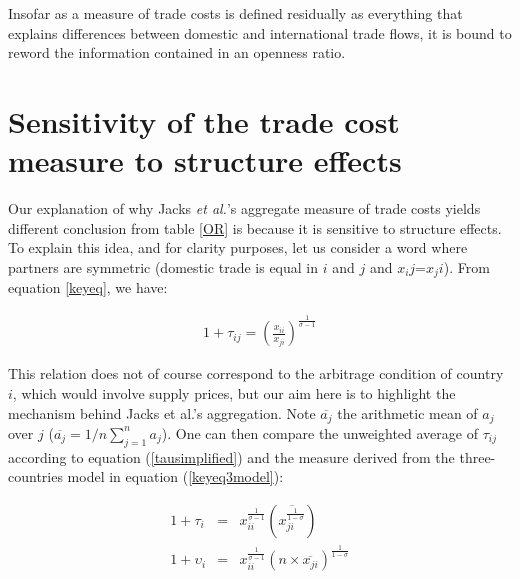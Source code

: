\documentclass{article}
\begin{document}
Insofar as a measure of trade costs is defined residually as everything that explains differences between domestic and international trade flows, it is bound to reword the information contained in an openness ratio.

\section{\label{3} Sensitivity of the trade cost measure to
structure effects}

Our explanation of why Jacks \textit{et al.}'s aggregate measure of
trade costs yields different conclusion 
from table \ref{OR} is because it is sensitive to structure
effects. To explain this idea, and for clarity purposes, let us consider
a word where partners are symmetric (domestic trade is equal in $i$ and $j$ and $x_ij$=$x_ji$). From equation \ref{keyeq}, we have:

\begin{eqnarray}
1+\tau_{ij}= \left(\frac{x_{ii}}{x_{ji}}\right)^{\frac{1}{\sigma-1}}\label{tausimplified}
\end{eqnarray}

This relation does not of course correspond to the arbitrage
condition of country $i$, which would involve supply prices,
but our aim here is to highlight the mechanism behind Jacks et
al.'s aggregation. Note $\overline{a_j}$ the arithmetic mean
of $a_j$ over $j$ ($\overline{a_j}=1/n \sum_{j=1}^{n}a_j$). One can
then compare the unweighted average of $\tau_{ij}$ according to equation 
(\ref{tausimplified}) and the measure derived from the
three-countries model in equation (\ref{keyeq3model}):

\begin{eqnarray}
1+\tau_i&=& x_{ii}^{\frac{1}{\sigma-1}} \left(\overline{{x_{ji}^{\frac{1}{1-\sigma}}}}\right) \label{tau}\\
1+\upsilon_i&=&x_{ii}^{\frac{1}{\sigma-1}} (n \times \overline{x_{ji}})^{\frac{1}{1-\sigma}}\label{upsilon}
\end{eqnarray}
\end{document}

